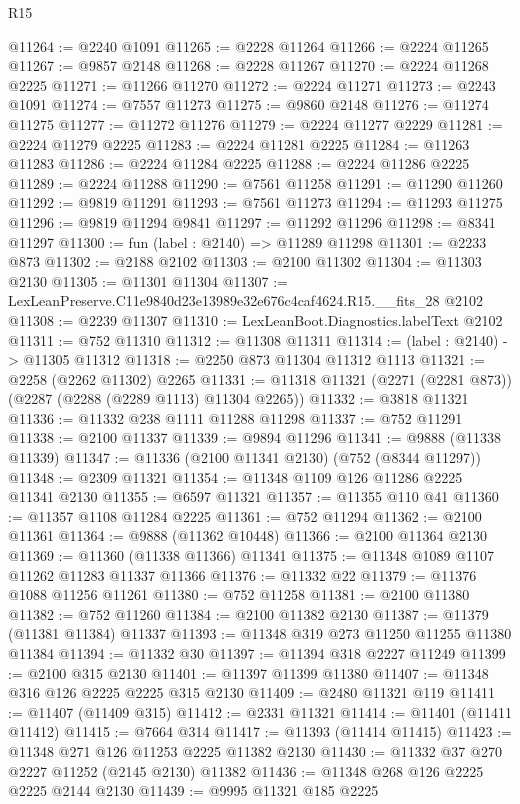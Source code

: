 \begin{lexlean}{R15}
\begin{coremodule}
@11264 := @2240 @1091
@11265 := @2228 @11264
@11266 := @2224 @11265
@11267 := @9857 @2148
@11268 := @2228 @11267
@11270 := @2224 @11268 @2225
@11271 := @11266 @11270
@11272 := @2224 @11271
@11273 := @2243 @1091
@11274 := @7557 @11273
@11275 := @9860 @2148
@11276 := @11274 @11275
@11277 := @11272 @11276
@11279 := @2224 @11277 @2229
@11281 := @2224 @11279 @2225
@11283 := @2224 @11281 @2225
@11284 := @11263 @11283
@11286 := @2224 @11284 @2225
@11288 := @2224 @11286 @2225
@11289 := @2224 @11288
@11290 := @7561 @11258
@11291 := @11290 @11260
@11292 := @9819 @11291
@11293 := @7561 @11273
@11294 := @11293 @11275
@11296 := @9819 @11294 @9841
@11297 := @11292 @11296
@11298 := @8341 @11297
@11300 := fun (label : @2140) => @11289 @11298
@11301 := @2233 @873
@11302 := @2188 @2102
@11303 := @2100 @11302
@11304 := @11303 @2130
@11305 := @11301 @11304
@11307 := LexLeanPreserve.C11e9840d23e13989e32e676c4caf4624.R15.__fits_28 @2102
@11308 := @2239 @11307
@11310 := LexLeanBoot.Diagnostics.labelText @2102
@11311 := @752 @11310
@11312 := @11308 @11311
@11314 := (label : @2140) -> @11305 @11312
@11318 := @2250 @873 @11304 @11312 @1113
@11321 := @2258 (@2262 @11302) @2265
@11331 := @11318 @11321 (@2271 (@2281 @873)) (@2287 (@2288 (@2289 @1113) @11304 @2265))
@11332 := @3818 @11321
@11336 := @11332 @238 @1111 @11288 @11298
@11337 := @752 @11291
@11338 := @2100 @11337
@11339 := @9894 @11296
@11341 := @9888 (@11338 @11339)
@11347 := @11336 (@2100 @11341 @2130) (@752 (@8344 @11297))
@11348 := @2309 @11321
@11354 := @11348 @1109 @126 @11286 @2225 @11341 @2130
@11355 := @6597 @11321
@11357 := @11355 @110 @41
@11360 := @11357 @1108 @11284 @2225
@11361 := @752 @11294
@11362 := @2100 @11361
@11364 := @9888 (@11362 @10448)
@11366 := @2100 @11364 @2130
@11369 := @11360 (@11338 @11366) @11341
@11375 := @11348 @1089 @1107 @11262 @11283 @11337 @11366
@11376 := @11332 @22
@11379 := @11376 @1088 @11256 @11261
@11380 := @752 @11258
@11381 := @2100 @11380
@11382 := @752 @11260
@11384 := @2100 @11382 @2130
@11387 := @11379 (@11381 @11384) @11337
@11393 := @11348 @319 @273 @11250 @11255 @11380 @11384
@11394 := @11332 @30
@11397 := @11394 @318 @2227 @11249
@11399 := @2100 @315 @2130
@11401 := @11397 @11399 @11380
@11407 := @11348 @316 @126 @2225 @2225 @315 @2130
@11409 := @2480 @11321 @119
@11411 := @11407 (@11409 @315)
@11412 := @2331 @11321
@11414 := @11401 (@11411 @11412)
@11415 := @7664 @314
@11417 := @11393 (@11414 @11415)
@11423 := @11348 @271 @126 @11253 @2225 @11382 @2130
@11430 := @11332 @37 @270 @2227 @11252 (@2145 @2130) @11382
@11436 := @11348 @268 @126 @2225 @2225 @2144 @2130
@11439 := @9995 @11321 @185 @2225

\end{coremodule}
\end{lexlean}
